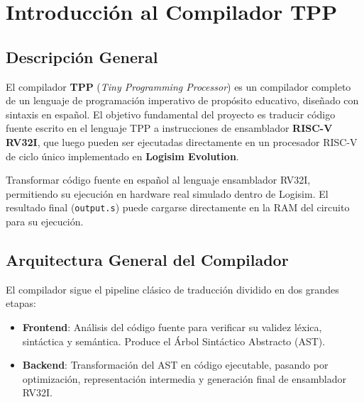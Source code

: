 \chapter{Introducción al Compilador TPP}

\section{Descripción General}

El compilador \textbf{TPP} (\textit{Tiny Programming Processor}) es un compilador completo de un lenguaje de programación imperativo de propósito educativo, diseñado con sintaxis en español. El objetivo fundamental del proyecto es traducir código fuente escrito en el lenguaje TPP a instrucciones de ensamblador \textbf{RISC-V RV32I}, que luego pueden ser ejecutadas directamente en un procesador RISC-V de ciclo único implementado en \textbf{Logisim Evolution}.

\begin{infobox}
Transformar código fuente en español al lenguaje ensamblador RV32I, permitiendo su ejecución en hardware real simulado dentro de Logisim. El resultado final (\texttt{output.s}) puede cargarse directamente en la RAM del circuito para su ejecución.
\end{infobox}

\section{Arquitectura General del Compilador}

El compilador sigue el pipeline clásico de traducción dividido en dos grandes etapas:

\begin{itemize}
    \item \textbf{Frontend}: Análisis del código fuente para verificar su validez léxica, sintáctica y semántica. Produce el Árbol Sintáctico Abstracto (AST).
    \item \textbf{Backend}: Transformación del AST en código ejecutable, pasando por optimización, representación intermedia y generación final de ensamblador RV32I.
\end{itemize}

